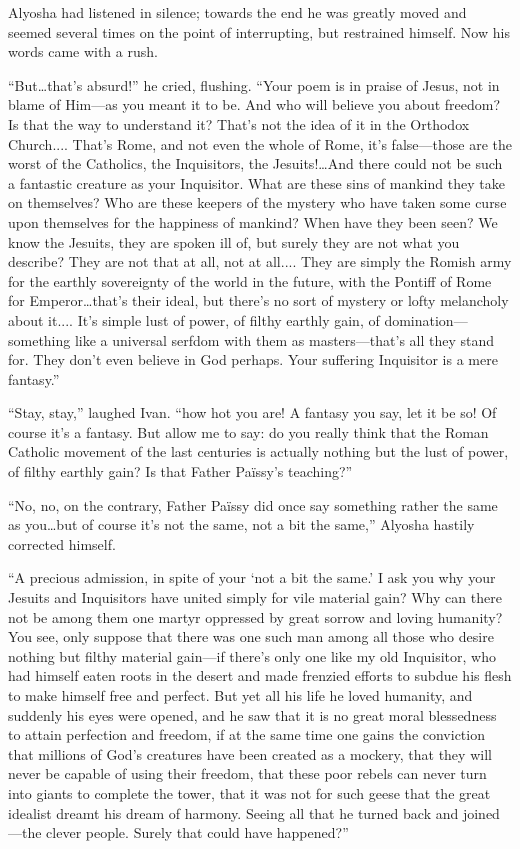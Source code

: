 Alyosha had listened in silence; towards the end he was greatly moved
and seemed several times on the point of interrupting, but restrained
himself. Now his words came with a rush.

``But\ldots that's absurd!'' he cried, flushing. ``Your poem is in
praise of Jesus, not in blame of Him---as you meant it  to
be. And who will believe you about freedom? Is that the way to
understand it? That's not the idea of it in the Orthodox Church....
That's Rome, and not even the whole of Rome, it's false---those are
the worst of the Catholics, the Inquisitors, the Jesuits!\ldots And
there could not be such a fantastic creature as your Inquisitor. What
are these sins of mankind they take on themselves? Who are these
keepers of the mystery who have taken some curse upon themselves for
the happiness of mankind? When have they been seen? We know the
Jesuits, they are spoken ill of, but surely they are not what you
describe? They are not that at all, not at all.... They are simply the
Romish army for the earthly sovereignty of the world in the future,
with the Pontiff of Rome for Emperor\ldots that's their ideal, but
there's no sort of mystery or lofty melancholy about it.... It's
simple lust of power, of filthy earthly gain, of
dom\-i\-na\-tion---some\-thing like a universal serfdom with them as
mas\-ters---that's all they stand for. They don't even believe in God
perhaps. Your suffering Inquisitor is a mere fantasy.''

``Stay, stay,'' laughed Ivan. ``how hot you are! A fantasy you say,
let it be so! Of course it's a fantasy. But allow me to say: do you
really think that the Roman Catholic movement of the last centuries is
actually nothing but the lust of power, of filthy earthly gain? Is
that Father Pa\"{i}ssy's teaching?''

``No, no, on the contrary, Father Pa\"{i}ssy did once say something
rather the same as you\ldots but of course it's not the same, not a
bit the same,'' Alyosha hastily corrected himself.

``A precious admission, in spite of your `not a bit the same.' I ask
you why your Jesuits and Inquisitors have united simply for vile
material gain? Why can there not be among them one martyr oppressed by
great sorrow and loving humanity? You see, only suppose that there was
one such man among all those who desire nothing but filthy material
gain---if there's only one like my old Inquisitor, who had himself
eaten roots in the desert and made frenzied efforts to subdue his
flesh to make himself free and perfect. But yet all his life he loved
humanity, and suddenly his eyes were opened, and he saw that it is no
great moral blessedness to attain perfection and freedom, if at the
same time one gains the conviction that millions of God's creatures
have been created as a mockery, that they will never be capable of
using their freedom, that these poor rebels can never turn into giants
to complete the tower, that it was not for such geese that the great
idealist dreamt his dream of harmony. Seeing  all that he
turned back and joined---the clever people. Surely that could have
happened?''

